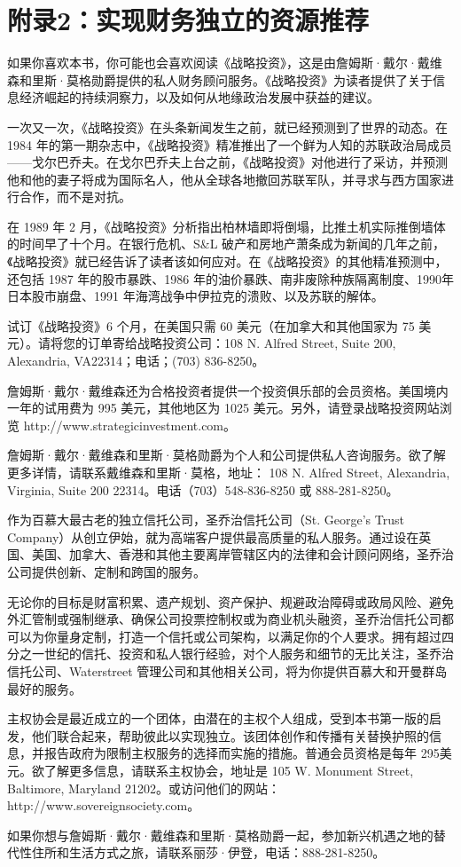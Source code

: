\thispagestyle{empty}
\chapter*{附录2：实现财务独立的资源推荐}

如果你喜欢本书，你可能也会喜欢阅读《战略投资》，这是由詹姆斯·戴尔·戴维森和里斯·莫格勋爵提供的私人财务顾问服务。《战略投资》为读者提供了关于信息经济崛起的持续洞察力，以及如何从地缘政治发展中获益的建议。

一次又一次，《战略投资》在头条新闻发生之前，就已经预测到了世界的动态。在 1984 年的第一期杂志中，《战略投资》精准推出了一个鲜为人知的苏联政治局成员——戈尔巴乔夫。在戈尔巴乔夫上台之前，《战略投资》对他进行了采访，并预测他和他的妻子将成为国际名人，他从全球各地撤回苏联军队，并寻求与西方国家进行合作，而不是对抗。

在 1989 年 2 月，《战略投资》分析指出柏林墙即将倒塌，比推土机实际推倒墙体的时间早了十个月。在银行危机、S\&L 破产和房地产萧条成为新闻的几年之前，《战略投资》就已经告诉了读者该如何应对。在《战略投资》的其他精准预测中，还包括 1987 年的股市暴跌、1986 年的油价暴跌、南非废除种族隔离制度、1990年日本股市崩盘、1991 年海湾战争中伊拉克的溃败、以及苏联的解体。

试订《战略投资》6 个月，在美国只需 60 美元（在加拿大和其他国家为 75 美元）。请将您的订单寄给战略投资公司：108 N. Alfred Street, Suite 200, Alexandria, VA22314；电话；(703) 836-8250。

詹姆斯·戴尔·戴维森还为合格投资者提供一个投资俱乐部的会员资格。美国境内一年的试用费为 995 美元，其他地区为 1025 美元。另外，请登录战略投资网站浏览 http://www.strategicinvestment.com。

詹姆斯·戴尔·戴维森和里斯·莫格勋爵为个人和公司提供私人咨询服务。欲了解更多详情，请联系戴维森和里斯·莫格，地址： 108 N. Alfred Street, Alexandria, Virginia, Suite 200 22314。电话（703）548-836-8250 或 888-281-8250。

作为百慕大最古老的独立信托公司，圣乔治信托公司（St. George's Trust Company）从创立伊始，就为高端客户提供最高质量的私人服务。通过设在英国、美国、加拿大、香港和其他主要离岸管辖区内的法律和会计顾问网络，圣乔治公司提供创新、定制和跨国的服务。

无论你的目标是财富积累、遗产规划、资产保护、规避政治障碍或政局风险、避免外汇管制或强制继承、确保公司投票控制权或为商业机头融资，圣乔治信托公司都可以为你量身定制，打造一个信托或公司架构，以满足你的个人要求。拥有超过四分之一世纪的信托、投资和私人银行经验，对个人服务和细节的无比关注，圣乔治信托公司、Waterstreet 管理公司和其他相关公司，将为你提供百慕大和开曼群岛最好的服务。

主权协会是最近成立的一个团体，由潜在的主权个人组成，受到本书第一版的启发，他们联合起来，帮助彼此以实现独立。该团体创作和传播有关替换护照的信息，并报告政府为限制主权服务的选择而实施的措施。普通会员资格是每年 295美元。欲了解更多信息，请联系主权协会，地址是 105 W. Monument Street, Baltimore, Maryland 21202。或访问他们的网站：http://www.sovereignsociety.com。


如果你想与詹姆斯·戴尔·戴维森和里斯·莫格勋爵一起，参加新兴机遇之地的替代性住所和生活方式之旅，请联系丽莎·伊登，电话：888-281-8250。

\let\cleardoublepage\clearpage